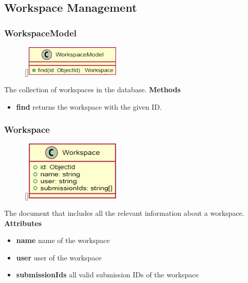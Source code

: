 \subsection{Workspace Management}

\subsubsection{WorkspaceModel}
\label{WorkspaceModel}
\begin{figure}
    \raisebox{0pt}[\dimexpr{}\baselineskip\relax]{\includegraphics[width=4.5cm]{classes/workspace-management/1.png}}
\end{figure} 
\par
The collection of workspaces in the database.
\newline
\newline
\textbf{Methods}
\begin{itemize}
    \item \textbf{find} returns the workspace with the given ID.
\end{itemize}

\subsubsection{Workspace}
\label{wm-Workspace}
\begin{figure}
    \raisebox{0pt}[\dimexpr{}\baselineskip\relax]{\includegraphics[width=4.5cm]{classes/workspace-management/2.png}}
\end{figure} 
\par
The document that includes all the relevant information about a workspace.
\newline
\newline
\textbf{Attributes}
\begin{itemize}
    \item \textbf{name} name of the workspace
    \item \textbf{user} user of the workspace
    \item \textbf{submissionIds} all valid submission IDs of the workspace
\end{itemize}

